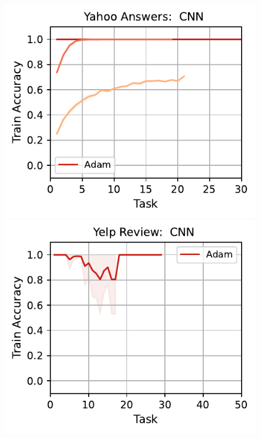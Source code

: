 \begin{figure}[htb!]
{        \includegraphics[width=\textwidth]{figs/Accuracy/nlp/cnn/yahoo_answers_50.pdf}
        \includegraphics[width=\textwidth]{figs/Accuracy/nlp/cnn/yelp_review_full_50.pdf}
    }
    \\
    \resizebox{\textwidth}{!}{
}
\end{figure}

